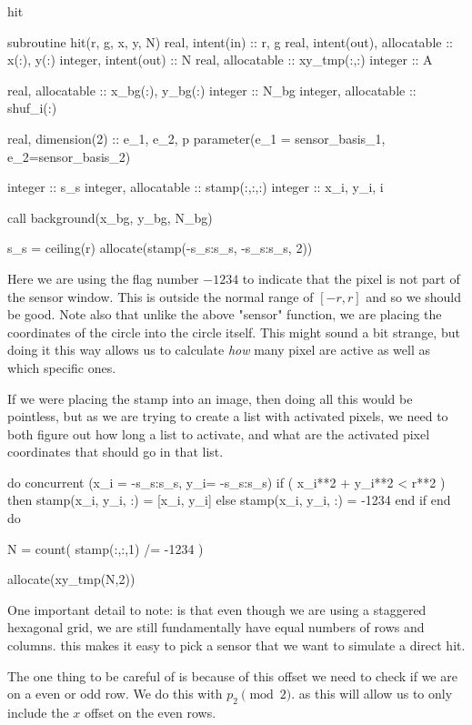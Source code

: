 \documentclass[10pt, a4paper]{article}
\begin{document}
\begin{codeblock}{hit}
\begin{code}
subroutine hit(r, g, x, y, N)
	real, intent(in) :: r, g
	real, intent(out), allocatable :: x(:), y(:)
	integer, intent(out) :: N 
	real, allocatable :: xy_tmp(:,:) 
	integer :: A
	
	
	real, allocatable :: x_bg(:), y_bg(:)
	integer :: N_bg 
	integer, allocatable :: shuf_i(:)
	
	real, dimension(2) :: e_1, e_2, p
	parameter(e_1 = sensor_basis_1, e_2=sensor_basis_2)
	
	integer :: s_s 
	integer, allocatable :: stamp(:,:,:)
	integer :: x_i, y_i, i
	
	call background(x_bg, y_bg, N_bg)
	
	s_s = ceiling(r)
	allocate(stamp(-s_s:s_s, -s_s:s_s, 2))
\end{code}
 Here we are using the flag number $-1234$ to indicate that the pixel is not part of the sensor window. This is outside the normal range of $[-r, r]$ and so we should be good. Note also that unlike the above "sensor" function, we are placing the coordinates of the circle into the circle itself. This might sound a bit strange, but doing it this way allows us to calculate \emph{how} many pixel are active as well as which specific ones. 
 
 If we were placing the stamp into an image, then doing all this would be pointless, but as we are trying to create a list with activated pixels, we need to both figure out how long a list to activate, and what are the activated pixel coordinates that should go in that list. 

\begin{code}
	do concurrent (x_i = -s_s:s_s, y_i= -s_s:s_s)
		if ( x_i**2 + y_i**2 < r**2 ) then 
			stamp(x_i, y_i, :) = [x_i, y_i]
		else
			stamp(x_i, y_i, :) = -1234
		end if 
	end do
	
	N = count( stamp(:,:,1) /= -1234 )
	
	allocate(xy_tmp(N,2))
\end{code}

One important detail to note: is that even though we are using a staggered hexagonal grid, we are still fundamentally have equal numbers of rows and columns. this makes it easy to pick a sensor that we want to simulate a direct hit.

The one thing to be careful of is because of this offset we need to check if we are on a even or odd row. We do this with $p_2 \pmod 2$. as this will allow us to only include the $x$ offset on the even rows. 


\end{codeblock}
\end{document}
